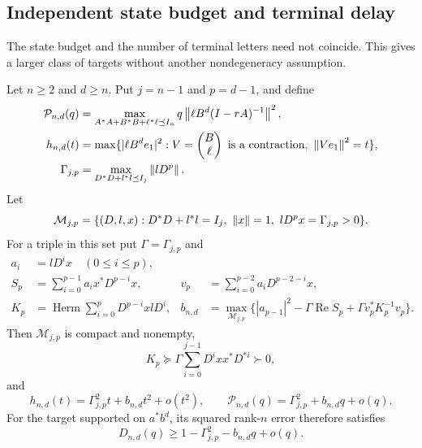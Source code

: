 

\subsection{Independent state budget and terminal delay}

The state budget and the number of terminal letters need not coincide.
This gives a larger class of targets without another nondegeneracy
assumption.

\begin{theorem}
\label{I:R:thm:independent-budget-delay-response}
Let $n\ge2$ and $d\ge n$.  Put $j=n-1$ and $p=d-1$, and define
\begin{align*}
 \mathcal P_{n,d}(q)&=
 \max_{A^*A+B^*B+\ell^*\ell\preceq I_n}
 q\left\lVert\ell B^d(I-rA)^{-1}\right\rVert^2,\\
 h_{n,d}(t)&=\max\{|\ell B^de_1|^2:
                  V=\begin{pmatrix}B\\\ell\end{pmatrix}
                  \text{ is a contraction},\ \left\lVert Ve_1\right\rVert^2=t\},\\
 \Gamma_{j,p}&=\max_{D^*D+l^*l\preceq I_j}\left\lVert lD^p\right\rVert.
\end{align*}
Let
\[
 \mathcal M_{j,p}=\{(D,l,x):D^*D+l^*l=I_j,\ \Rnorm x=1,
                                     \ lD^px=\Gamma_{j,p}>0\}.
\]
For a triple in this set put $\Gamma=\Gamma_{j,p}$ and
\begin{align*}
 a_i&=lD^ix\quad(0\le i\le p),\\
 S_p&=\sum_{i=0}^{p-1}a_i x^*D^{p-i}x,
 &v_p&=\sum_{i=0}^{p-2}a_iD^{p-2-i}x,\\
 K_p&=\operatorname{Herm}\sum_{i=0}^{p}D^{p-i}xlD^i,
 &b_{n,d}&=\max_{\mathcal M_{j,p}}
    \bigl\{|a_{p-1}|^2-\Gamma\operatorname{Re}S_p
                           +\Gamma v_p^*K_p^{-1}v_p\bigr\}.
\end{align*}
Then $\mathcal M_{j,p}$ is compact and nonempty,
\begin{equation}
 K_p\succeq\Gamma\sum_{i=0}^{j-1}D^ixx^*D^{*i}\succ0,
 \label{I:R:eq:independent-delay-K-positive}
\end{equation}
and
\begin{equation}
 \boxed{\displaystyle
 h_{n,d}(t)=\Gamma_{j,p}^2t+b_{n,d}t^2+o(t^2),\qquad
 \mathcal P_{n,d}(q)=\Gamma_{j,p}^2+b_{n,d}q+o(q).}
 \label{I:R:eq:independent-delay-expansion}
\end{equation}
For the target supported on $a^*b^d$, its squared rank-$n$ error therefore
satisfies
\[
 D_{n,d}(q)\ge1-\Gamma_{j,p}^2-b_{n,d}q+o(q).
\]
\end{theorem}


